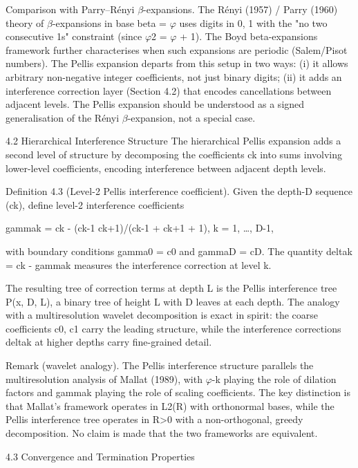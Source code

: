   Comparison with Parry--Rényi $\beta$-expansions. The Rényi (1957) / Parry (1960) theory of
  $\beta$-expansions in base beta = $\varphi$ uses digits in {0, 1} with the "no two consecutive 1s"
  constraint (since $\varphi$2 = $\varphi$ + 1). The Boyd beta-expansions framework further
  characterises when such expansions are periodic (Salem/Pisot numbers). The Pellis
  expansion departs from this setup in two ways: (i) it allows arbitrary non-negative
  integer coefficients, not just binary digits; (ii) it adds an interference correction layer
  (Section 4.2) that encodes cancellations between adjacent levels. The Pellis expansion
  should be understood as a signed generalisation of the Rényi $\beta$-expansion, not a special
  case.

  4.2 Hierarchical Interference Structure
  The hierarchical Pellis expansion adds a second level of structure by decomposing the
  coefficients ck into sums involving lower-level coefficients, encoding interference
  between adjacent depth levels.

        Definition 4.3 (Level-2 Pellis interference coefficient). Given the depth-D
        sequence (ck), define level-2 interference coefficients

  gammak = ck - (ck-1 ck+1)/(ck-1 + ck+1 + 1), k = 1, …, D-1,

  with boundary conditions gamma0 = c0 and gammaD = cD. The quantity deltak = ck -
  gammak measures the interference correction at level k.

  The resulting tree of correction terms at depth L is the Pellis interference tree P(x, D,
  L), a binary tree of height L with D leaves at each depth. The analogy with a
  multiresolution wavelet decomposition is exact in spirit: the coarse coefficients c0, c1
  carry the leading structure, while the interference corrections deltak at higher depths
  carry fine-grained detail.

        Remark (wavelet analogy). The Pellis interference structure parallels the
        multiresolution analysis of Mallat (1989), with $\varphi$-k playing the role of dilation
        factors and gammak playing the role of scaling coefficients. The key distinction is
        that Mallat's framework operates in L2(R) with orthonormal bases, while the Pellis
        interference tree operates in R>0 with a non-orthogonal, greedy decomposition.
        No claim is made that the two frameworks are equivalent.

  4.3 Convergence and Termination Properties

